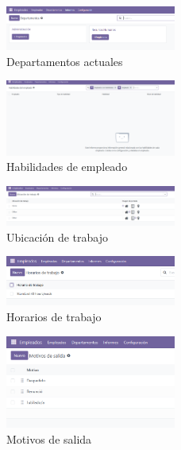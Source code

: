 \documentclass[a4paper,12pt]{article}
\begin{document}
\begin{figure}[h!]
    \centering
    \includegraphics[width=0.5\textwidth]{pr2odoo19-departamentos.png}
    \caption{Departamentos actuales}
\end{figure}
\FloatBarrier

\begin{figure}[h!]
    \centering
    \includegraphics[width=0.5\textwidth]{pr2odoo20-habilidadesDeEmpleado.png}
    \caption{Habilidades de empleado}
\end{figure}
\FloatBarrier

\begin{figure}[h!]
    \centering
    \includegraphics[width=0.5\textwidth]{pr2odoo21-ubicacionDeTrabajo.png}
    \caption{Ubicación de trabajo}
\end{figure}
\FloatBarrier

\begin{figure}[h!]
    \centering
    \includegraphics[width=0.5\textwidth]{pr2odoo22-horarios.png}
    \caption{Horarios de trabajo}
\end{figure}
\FloatBarrier

\begin{figure}[h!]
    \centering
    \includegraphics[width=0.5\textwidth]{pr2odoo23-motivosSalida.png}
    \caption{Motivos de salida}
\end{figure}
\FloatBarrier
\end{document}
